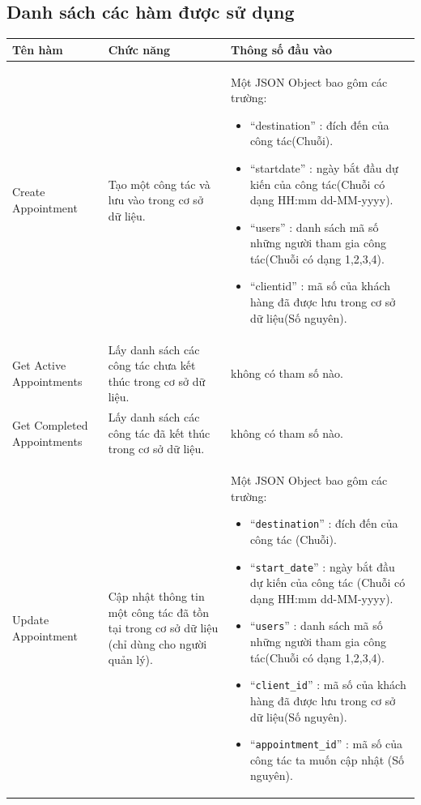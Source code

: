 \documentclass{article}
\begin{document}
\subsection{Danh sách các hàm được sử dụng}

\begin{longtable}{ | p{} |p{} | p{}  | } 
\hline
\textbf{Tên hàm}& \textbf{Chức năng}& \textbf{Thông số đầu vào} \\ 
\hline

\hline
Create Appointment & 
Tạo một công tác và lưu vào trong cơ sở dữ liệu. &
Một JSON Object bao gôm các trường:
\begin{itemize}
  \item “destination” : đích đến của công tác(Chuỗi).
  \item “startdate” : ngày bắt đầu dự kiến của công tác(Chuỗi  có dạng HH:mm dd-MM-yyyy).
  \item “users” : danh sách mã số những người tham gia công tác(Chuỗi có dạng 1,2,3,4).
  \item “clientid” : mã số của khách hàng đã được lưu trong cơ sở dữ liệu(Số  nguyên). 
\end{itemize}
  \\ 
\hline
Get Active Appointments & 
Lấy danh sách các công tác chưa kết thúc trong cơ sở dữ liệu. &
không có tham số nào. \\

\hline
Get Completed Appointments & 
Lấy danh sách các công tác đã kết thúc trong cơ sở dữ liệu. &
không có tham số nào. \\ 

\hline
Update Appointment & 
Cập nhật thông tin một công tác đã tồn tại trong cơ sở dữ liệu (chỉ dùng cho người quản lý). &
Một JSON Object bao gôm các trường: 
\begin{itemize}
  \item “\verb|destination|” : đích đến của công tác (Chuỗi). 
  \item “\verb|start_date|” : ngày bắt đầu dự kiến của công tác (Chuỗi  có dạng HH:mm dd-MM-yyyy).
  \item “\verb|users|” : danh sách mã số những người tham gia công tác(Chuỗi có dạng 1,2,3,4).
  \item “\verb|client_id|” : mã số của khách hàng đã được lưu trong cơ sở dữ liệu(Số  nguyên).
  \item “\verb|appointment_id|” : mã số của công tác ta muốn cập nhật (Số nguyên). 
\end{itemize}
\\ 


\end{longtable}
\end{document}
